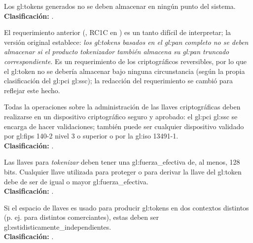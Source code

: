 {
  Los \glspl{gl:token} generados no se deben almacenar en ningún punto del
  sistema. \\
  \nopagebreak[4]
  \textbf{Clasificación:} .
}

El requerimiento anterior (,
RC1C en \cite{pci_tokens}) es un tanto difícil de interpretar; la versión
original establece: \textit{los \glspl{gl:token} basados en el \gls{gl:pan}
completo no se deben almacenar si el producto tokenizador también almacena
su \gls{gl:pan} truncado correspondiente}. Es un requerimiento de los
criptográficos reversibles, por lo que el \gls{gl:token} no se debería
almacenar bajo ninguna circunstancia (según la propia clasificación del
\gls{gl:pci} \gls{gl:ssc}); la redacción del requerimiento se cambió para
reflejar este hecho.

{
  Todas la operaciones sobre la administración de las llaves criptográficas
  deben realizarse en un dispositivo criptográfico seguro y aprobado: el
  \gls{gl:pci} \gls{gl:ssc} se encarga de hacer validaciones; también puede ser
  cualquier dispositivo validado por \gls{gl:fips} 140-2 nivel 3 o superior
  \cite{nist_modulos_criptograficos} o por la \gls{gl:iso} 13491-1. \\
  \nopagebreak[4]
  \textbf{Clasificación:} .
}

{
  Las llaves para \textit{tokenizar} deben tener una
  \gls{gl:fuerza_efectiva} de, al menos, 128 bits. Cualquier llave utilizada
  para proteger o para derivar la llave del \gls{gl:token} debe de ser de igual
  o mayor \gls{gl:fuerza_efectiva}. \\
  \nopagebreak[4]
  \textbf{Clasificación:} .
}

{
  Si el espacio de llaves es usado para producir \glspl{gl:token} en dos
  contextos distintos (p. ej. para distintos comerciantes), estas deben ser
  \glspl{gl:estidisticamente_independiente}. \\
  \nopagebreak[4]
  \textbf{Clasificación:} .
}

